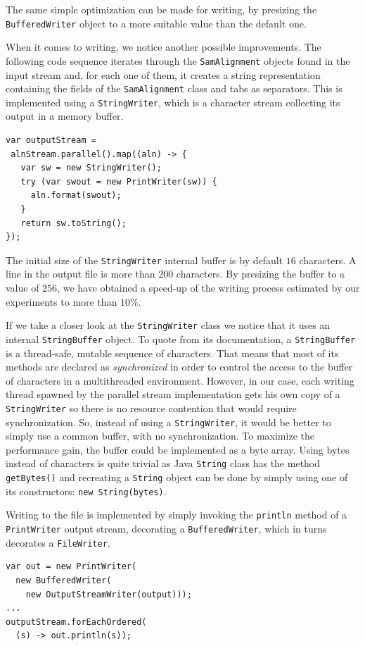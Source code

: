 \documentclass[a4paper,twoside]{article}
\begin{document}
The same simple optimization can be made for writing, by presizing the {\tt BufferedWriter} object to a more suitable value than the default one.

When it comes to writing, we notice another possible improvements. The following code sequence iterates through the {\tt SamAlignment} objects found in the input stream and, for each one of them, it creates a string representation containing the fields of the  {\tt SamAlignment} class and tabs as separators.
This is implemented using a {\tt StringWriter}, which is a character stream collecting its output in a memory buffer.
\begin{verbatim}
var outputStream = 
 alnStream.parallel().map((aln) -> {
   var sw = new StringWriter();
   try (var swout = new PrintWriter(sw)) {
     aln.format(swout);
   }
   return sw.toString();
});
\end{verbatim}

The initial size of the {\tt StringWriter} internal buffer is by default $16$ characters. A line in the output file is more than $200$ characters. By presizing the buffer to a value of $256$, we have obtained a speed-up of the writing process estimated by our experiments to more than $10\%$.

If we take a closer look at the {\tt StringWriter} class we notice that it uses an internal {\tt StringBuffer} object. To quote from its documentation, a {\tt StringBuffer} is  a thread-safe, mutable sequence of characters. That means that most of its methods are declared as {\it synchronized} in order to control the access to the buffer of characters in a multithreaded environment.
However, in our case, each writing thread spawned by the parallel stream implementation gets his own copy of a {\tt StringWriter} so there is no resource contention that would require synchronization.
So, instead of using a {\tt StringWriter}, it would be better to simply use a common buffer, with no synchronization. To maximize the performance gain, the buffer could be implemented as a byte array. 
Using bytes instead of characters is quite trivial as Java {\tt String} class has the method {\tt getBytes()} and recreating a {\tt String} object can be done by simply using one of its constructors: {\tt new String(bytes)}.

Writing to the file is implemented by simply invoking the {\tt println} method of a {\tt PrintWriter} output stream, decorating a {\tt BufferedWriter}, which in turns decorates a {\tt FileWriter}.
\begin{verbatim}
var out = new PrintWriter(
  new BufferedWriter(
    new OutputStreamWriter(output)));
...    
outputStream.forEachOrdered(
  (s) -> out.println(s));
\end{verbatim}
\end{document}

